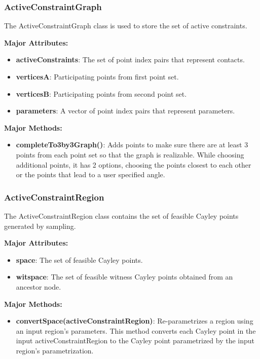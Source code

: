 \subsubsection{ActiveConstraintGraph} 
The ActiveConstraintGraph class is used to store the set of active constraints.

\noindent \textbf{Major Attributes:} 
\begin{itemize}
		\item  \textbf{activeConstraints}: The set of point index pairs that represent 
				contacts.
		\item  \textbf{verticesA}: Participating points from first point set.
		\item  \textbf{verticesB}: Participating points from second point set.
		\item  \textbf{parameters}: A vector of point index pairs that represent parameters.
\end{itemize}

\noindent \textbf{Major Methods:}
\begin{itemize}
		\item  \textbf{completeTo3by3Graph()}: Adds points to make sure there
				are at least 3 points from each point set so that the graph is
				realizable. While choosing additional points, it has 2 options,
				choosing the points closest to each other or the points that lead
				to a user specified angle.
\end{itemize}


\subsubsection{ActiveConstraintRegion} 
The ActiveConstraintRegion class contains the set of feasible Cayley points generated
by sampling.

\noindent \textbf{Major Attributes:} 
\begin{itemize}
		\item  \textbf{space}: The set of feasible Cayley points.
		\item  \textbf{witspace}: The set of feasible witness Cayley points
				obtained from an ancestor node.
\end{itemize}

\noindent \textbf{Major Methods:}
\begin{itemize}
		\item  \textbf{convertSpace(activeConstraintRegion)}: Re-parametrizes
				a region using an input region’s parameters. This method
				converts each Cayley point in the input activeConstraintRegion
				to the Cayley point parametrized by the input region's
				parametrization.
\end{itemize}


